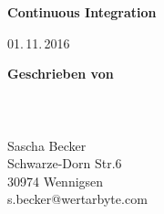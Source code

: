 \documentclass[11pt,DIV12,BCOR0mm,oneside,headings=normal,%
  numbers=noenddot,headsepline,headinclude]{scrreprt}
\begin{document}

\thispagestyle{empty}
{}

\begin{center}
  \vspace*{4\baselineskip}
  {\sffamily\bfseries\LARGE
    Continuous Integration\par}
  
  \vspace*{4\baselineskip}
  {\Large }

  \vfill
  {\Large }
  
  \vspace*{4\baselineskip}
  {\Large \par}
  
  \vspace*{4\baselineskip}
  {\Large 01.\,11.\,2016}
  
  \vspace*{4\baselineskip}
\end{center}


{\huge\textbf{Geschrieben von}} \\
\\
\\
\textbf{} \\
Sascha Becker \\
Schwarze-Dorn Str.6 \\
30974 Wennigsen \\
s.becker@wertarbyte.com \\
\\
\\
\\
\\
\\
\\
\\
\\
\\
\\
\\
\\
\\
\\
\\
\\
\\
\\
\\
\\
\\
\\


\tableofcontents    %


\newpage
{}


\end{document}
